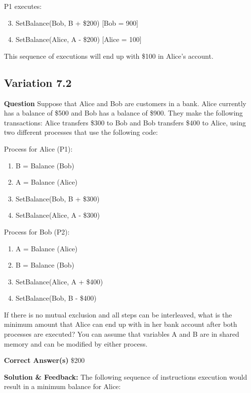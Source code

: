 P1 executes:\\
\begin{enumerate}
    \setcounter{enumi}{2}
    \item SetBalance(Bob, B + \$200) [Bob = 900]
    \item SetBalance(Alice, A - \$200) [Alice = 100]
\end{enumerate}

This sequence of executions will end up with \$100 in Alice’s account.\\

\subsection{Variation 7.2}

\textbf{Question}
Suppose that Alice and Bob are customers in a bank. Alice currently has a balance of \$500 and Bob has a balance of \$900. They make the following transactions: Alice transfers \$300 to Bob and Bob transfers \$400 to Alice, using two different processes that use the following code:

Process for Alice (P1):
\begin{enumerate}
    \item B = Balance (Bob)
    \item A = Balance (Alice)
    \item SetBalance(Bob, B + \$300)
    \item SetBalance(Alice, A - \$300)
\end{enumerate}

Process for Bob (P2):
\begin{enumerate}
    \item A = Balance (Alice)
    \item B = Balance (Bob)
    \item SetBalance(Alice, A + \$400)
    \item SetBalance(Bob, B - \$400)
\end{enumerate}

If there is no mutual exclusion and all steps can be interleaved, what is the minimum amount that Alice can end up with in her bank account after both processes are executed? You can assume that variables A and B are in shared memory and can be modified by either process.

\textbf{Correct Answer(s)}
\$200

\textbf{Solution \& Feedback:}
The following sequence of instructions execution would result in a minimum balance for Alice:

